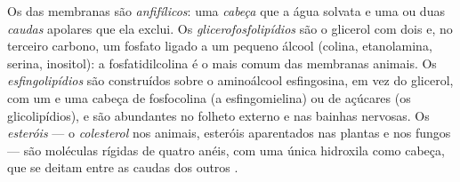 \begin{definition}\label{def:b1:lipids:amphiphilic}
Os  das membranas são
\emph{anfifílicos}: uma \emph{cabeça} 
que a água solvata e uma ou duas \emph{caudas} apolares que ela exclui.
Os \emph{glicerofosfolipídios} são o glicerol com
dois  e, no terceiro carbono, um fosfato ligado a um
pequeno álcool  (colina, etanolamina, serina, inositol): a
fosfatidilcolina é o  mais comum das membranas animais. Os
\emph{esfingolipídios} são construídos sobre o
aminoálcool esfingosina, em vez do glicerol, com um  e uma
cabeça de fosfocolina (a esfingomielina) ou de açúcares (os
glicolipídios), e são abundantes no folheto externo e nas bainhas
nervosas. Os \emph{esteróis} --- o
\emph{colesterol} nos animais, esteróis aparentados
nas plantas e nos fungos --- são moléculas rígidas de quatro anéis, com
uma única hidroxila como cabeça, que se deitam entre as caudas dos
outros .
\end{definition}

